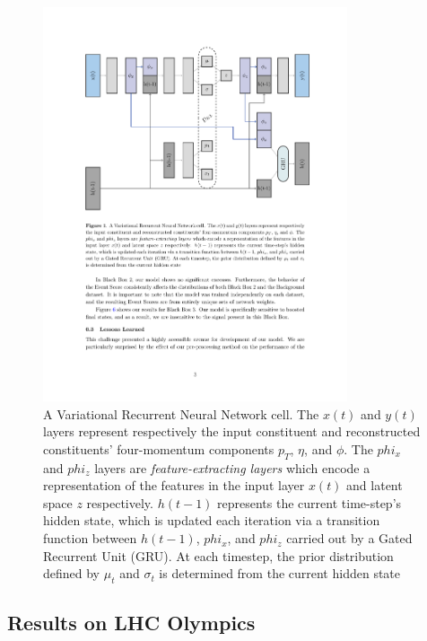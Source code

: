 \documentclass[letterpaper,11pt]{article}
\begin{document}
\begin{figure}
  \begin{center}
  
   \includegraphics[width=0.8\textwidth]{imgs/VRNN_Diagram.pdf}
  
  \end{center}
  \caption{A Variational Recurrent Neural Network cell. The $x(t)$ and $y(t)$ layers represent respectively the input constituent and reconstructed constituents' four-momentum components $p_{T}$, $\eta$, and $\phi$. The $phi_{x}$ and $phi_{z}$ layers are \textit{feature-extracting layers} which encode a representation of the features in the input layer $x(t)$ and latent space $z$ respectively. $h(t-1)$ represents the current time-step's hidden state, which is updated each iteration via a transition function between $h(t-1)$, $phi_{x}$, and $phi_{z}$ carried out by a Gated Recurrent Unit (GRU). At each timestep, the prior distribution defined by $\mu_{t}$ and $\sigma_{t}$ is determined from the current hidden state}
  \label{fig:VRNN}
\end{figure}

\subsection{Results on LHC Olympics}
\label{sec:results}
\end{document}

